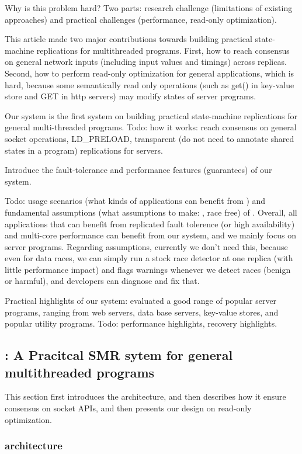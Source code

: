 Why is this problem hard? Two parts: research challenge (limitations of 
existing approaches) and practical 
challenges (performance, read-only optimization).


This article made two major contributions towards building practical state-
machine replications for multithreaded programs. First, how to reach 
consensus on general network inputs (including input values and timings) 
across replicas. Second, how to perform read-only 
optimization for general applications, which is hard, because some 
semantically read only operations (such as get() in key-value store and GET 
in http servers) may modify states of server programs.

Our system is the first system on building practical state-machine 
replications for general multi-threaded programs. Todo: how it works: reach 
consensus on general socket operations, LD\_PRELOAD, transparent (do not need 
to annotate shared states in a program) replications for servers.

Introduce the fault-tolerance and performance features (guarantees) of our 
system.

Todo: usage scenarios (what kinds of applications can benefit from \msmr) and
fundamental assumptions (what assumptions to make: \eg, race free) of \msmr. 
Overall, all applications that can benefit from replicated fault tolerence (or 
high availability) and 
multi-core performance can benefit from our system, and we mainly focus on 
server programs. Regarding assumptions, currently we don't need this, because 
even for data races, we can simply run a stock race detector at one replica 
(with little performance impact) and 
flags warnings whenever we detect races (benign or harmful), and developers can 
diagnose and fix that.

Practical highlights of our system: evaluated a good range of popular server 
programs, ranging from web servers, data base servers, key-value stores, and 
popular utility programs. Todo: performance highlights, recovery highlights.

\subsection{\msmr: A Pracitcal SMR sytem for general multithreaded programs} \label{sec:rep-msmr}
This section first introduces the \msmr architecture, and then describes how it 
ensure consensus on socket APIs, and then presents our design on read-only 
optimization.

\subsubsection{\msmr architecture} \label{sec:rep-arch}

